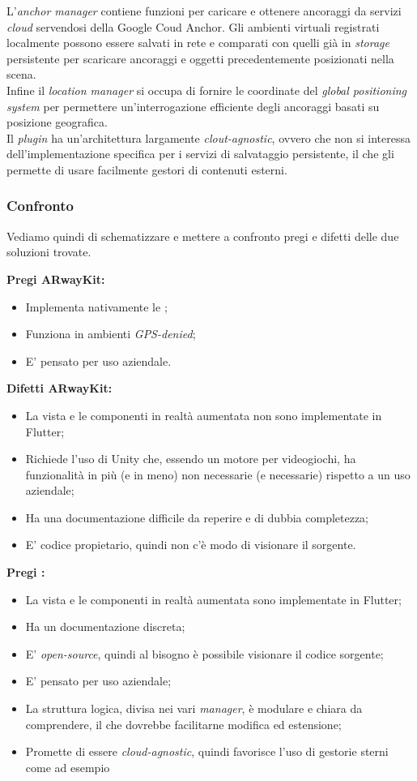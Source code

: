 L'\textit{anchor manager} contiene funzioni per caricare e ottenere ancoraggi da servizi \textit{cloud} servendosi della \api{} Google Coud Anchor. Gli ambienti virtuali registrati localmente possono essere salvati in rete e comparati con quelli già in \textit{storage} persistente per scaricare ancoraggi e oggetti precedentemente posizionati nella scena.\\
Infine il \textit{location manager} si occupa di fornire le coordinate del \textit{global positioning system}  per permettere un'interrogazione efficiente degli ancoraggi basati su posizione geografica.\\
Il \textit{plugin} ha un'architettura largamente \textit{clout-agnostic}, ovvero che non si interessa dell'implementazione specifica per i servizi di salvataggio persistente, il che gli permette di usare facilmente gestori di contenuti esterni.

\subsubsection{Confronto}
Vediamo quindi di schematizzare e mettere a confronto pregi e difetti delle due soluzioni trovate.\aCapo{}

\textbf{Pregi ARwayKit:}
\begin{itemize}
  \item Implementa nativamente le \asa{};
  \item Funziona in ambienti \textit{GPS-denied};
  \item E' pensato per uso aziendale.
\end{itemize}

\textbf{Difetti ARwayKit:}
\begin{itemize}
  \item La vista e le componenti in realtà aumentata non sono implementate in Flutter;
  \item Richiede l'uso di Unity che, essendo un motore per videogiochi, ha funzionalità in più (e in meno) non necessarie (e necessarie) rispetto a un uso aziendale;
  \item Ha una documentazione difficile da reperire e di dubbia completezza;
  \item E' codice propietario, quindi non c'è modo di visionare il sorgente.
\end{itemize}

\textbf{Pregi \aplug{}:}
\begin{itemize}
  \item La vista e le componenti in realtà aumentata sono implementate in Flutter;
  \item Ha un documentazione discreta;
  \item E' \textit{open-source}, quindi al bisogno è possibile visionare il codice sorgente;
  \item E' pensato per uso aziendale;
  \item La struttura logica, divisa nei vari \textit{manager}, è modulare e chiara da comprendere, il che dovrebbe facilitarne modifica ed estensione;
  \item Promette di essere \textit{cloud-agnostic}, quindi favorisce l'uso di gestorie sterni come ad esempio \asa{} 
\end{itemize}

